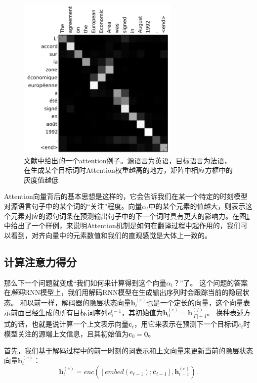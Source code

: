 \documentclass[10pt,a4paper]{ctexart}
\begin{document}
\begin{figure}[H]
\centering
\includegraphics[width=0.7\textwidth]{fig27.png}
\caption{文献\cite{bahdanau2014neural}中给出的一个attention例子。源语言为英语，目标语言为法语，在生成某个目标词时Attention权重越高的地方，矩阵中相应方框中的灰度值越低}
\label{fig:27}
\end{figure}

Attention向量背后的基本思想是这样的，它会告诉我们在某一个特定的时刻模型对源语言句子中的某个词的“关注”程度。向量$\textbf{$\alpha$}_t$中的某个元素的值越大，则表示这个元素对应的源句词条在预测输出句子中的下一个词时具有更大的影响力。在图\ref{fig:27}中给出了一个样例，来说明Attention机制是如何在翻译过程中起作用的，我们可以看到，对齐向量中的元素数值和我们的直观感觉是大体上一致的。

\subsection{计算注意力得分}
那么下一个问题就变成“我们如何来计算得到这个向量$\textbf{$\alpha$}_t$？”了。
这个问题的答案在\textit{解码}RNN模型上，我们用解码RNN模型在生成输出序列时会跟踪当前的隐层状态。
和以前一样，解码器的隐层状态向量$\textbf{h}_t^{(e)}$也是一个定长的向量，这个向量表示前面已经生成的所有目标词序列$e_1^{t-1}$，其初始值为$\textbf{h}_0^{(e)} = \textbf{h}_{|F|+1}^{(f)}$。
换种表述方式的话，也就是说计算一个上文表示向量$\textbf{c}_t$，用它来表示在预测下一个目标词$e_t$时模型关注的源端上文信息，且其初始值为$\textbf{c}_0 = \textbf{0}$。

首先，我们基于解码过程中的前一时刻的词表示和上文向量来更新当前的隐层状态向量$\textbf{h}_t^{(e)}$：
\[
 \textbf{h}_t^{(e)} = enc([embed(e_{t-1});\textbf{c}_{t-1}],\textbf{h}_{t-1}^{(e)}).
\]
\end{document}

